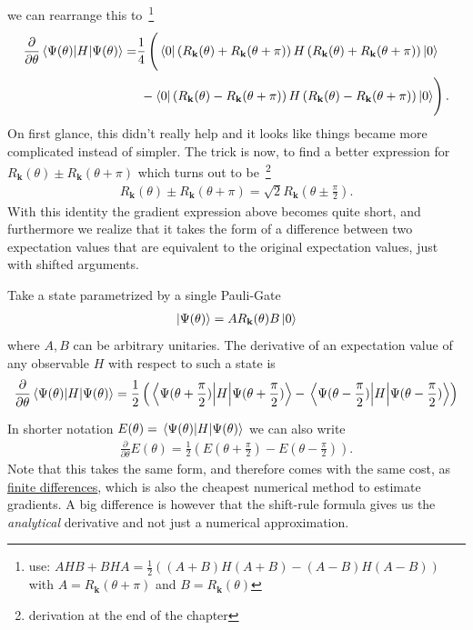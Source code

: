 we can rearrange this to~\footnote{use: $AHB + BHA = \frac{1}{2}\left((A+B)H(A+B) - (A-B)H(A-B)\right)$ with $A=R_\mathbf{k}(\theta+\pi)$ and $B=R_\mathbf{k}(\theta)$}
\begin{align}
    \frac{\partial}{\partial \theta} \expval{H}{\Psi(\theta)} =& \frac{1}{4}\left(\vphantom{\sum_k^l}
    \bra{0}\left(R_\mathbf{k}(\theta) + R_\mathbf{k}(\theta+\pi)\right) H \left(R_\mathbf{k}(\theta) + R_\mathbf{k}(\theta+\pi)\right)\ket{0}
    \right.\nonumber\\ &\left.\vphantom{\sum_k^l}- \bra{0}\left(R_\mathbf{k}(\theta) - R_\mathbf{k}(\theta+\pi)\right) H \left(R_\mathbf{k}(\theta) - R_\mathbf{k}(\theta+\pi)\right)\ket{0}\right).
\end{align}
On first glance, this didn't really help and it looks like things became more complicated instead of simpler. The trick is now, to find a better expression for $R_\mathbf{k}(\theta) \pm R_\mathbf{k}(\theta+\pi)$ which turns out to be~\footnote{derivation at the end of the chapter}
\begin{align}
    R_\mathbf{k}(\theta) \pm R_\mathbf{k}(\theta+\pi) = \sqrt{2} R_\mathbf{k}(\theta \pm \frac{\pi}{2}).
\end{align}
With this identity the gradient expression above becomes quite short, and furthermore we realize that it takes the form of a difference between two expectation values that are equivalent to the original expectation values, just with shifted arguments. 

\begin{theorem*}
    Take a state parametrized by a single Pauli-Gate
    \begin{align}
        \ket{\Psi(\theta)} = A R_\mathbf{k}(\theta)B\ket{0}
    \end{align}
    where $A,B$ can be arbitrary unitaries.
    The derivative of an expectation value of any observable $H$ with respect to such a state is
    \begin{align}
        \frac{\partial}{\partial \theta} \expval{H}{\Psi(\theta)} = \frac{1}{2}\left( \expval{H}{\Psi(\theta+\frac{\pi}{2})} - \expval{H}{\Psi(\theta-\frac{\pi}{2})}\right)\nonumber
    \end{align}
\end{theorem*}
In shorter notation $E(\theta) = \expval{H}{\Psi(\theta)}$ we can also write
\begin{align}
    \frac{\partial}{\partial \theta} E(\theta) = \frac{1}{2}\left(E(\theta+\frac{\pi}{2}) - E(\theta-\frac{\pi}{2})\right).
\end{align}
Note that this takes the same form, and therefore comes with the same cost, as \href{https://en.wikipedia.org/wiki/Finite_difference}{finite differences}, which is also the cheapest numerical method to estimate gradients. A big difference is however that the shift-rule formula gives us the \textit{analytical} derivative and not just a numerical approximation.

